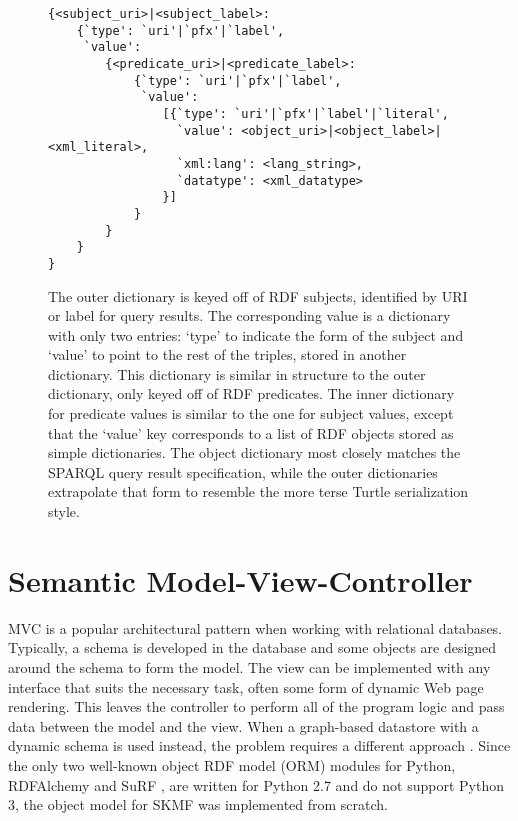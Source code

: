 \begin{figure}[h]
\singlespace
\begin{verbatim}
{<subject_uri>|<subject_label>:
    {`type': `uri'|`pfx'|`label',
     `value':
        {<predicate_uri>|<predicate_label>:
            {`type': `uri'|`pfx'|`label',
             `value':
                [{`type': `uri'|`pfx'|`label'|`literal',
                  `value': <object_uri>|<object_label>|<xml_literal>,
                  `xml:lang': <lang_string>,
                  `datatype': <xml_datatype>
                }]
            }
        }
    }
}
\end{verbatim}
\caption[Structure of a triple in SKMF]
 {\narrower The outer dictionary is keyed off of RDF subjects, identified by URI or label for query results. The corresponding value is a dictionary with only two entries: `type' to indicate the form of the subject and `value' to point to the rest of the triples, stored in another dictionary. This dictionary is similar in structure to the outer dictionary, only keyed off of RDF predicates. The inner dictionary for predicate values is similar to the one for subject values, except that the `value' key corresponds to a list of RDF objects stored as simple dictionaries. The object dictionary most closely matches the SPARQL query result specification, while the outer dictionaries extrapolate that form to resemble the more terse Turtle serialization style.
 }
\label{skmf-triple}
\end{figure}



\section{Semantic Model-View-Controller}
\label{method:mvc}

MVC is a popular architectural pattern when working with relational databases. Typically, a schema is developed in the database and some objects are designed around the schema to form the model. The view can be implemented with any interface that suits the necessary task, often some form of dynamic Web page rendering. This leaves the controller to perform all of the program logic and pass data between the model and the view. When a graph-based datastore with a dynamic schema is used instead, the problem requires a different approach
\cite{semanticwebprogram}.
Since the only two well-known object RDF model (ORM) modules for Python, RDFAlchemy
\cite{rdfalchemy}
and SuRF
\cite{surf},
are written for Python 2.7 and do not support Python 3, the object model for SKMF was implemented from scratch.


